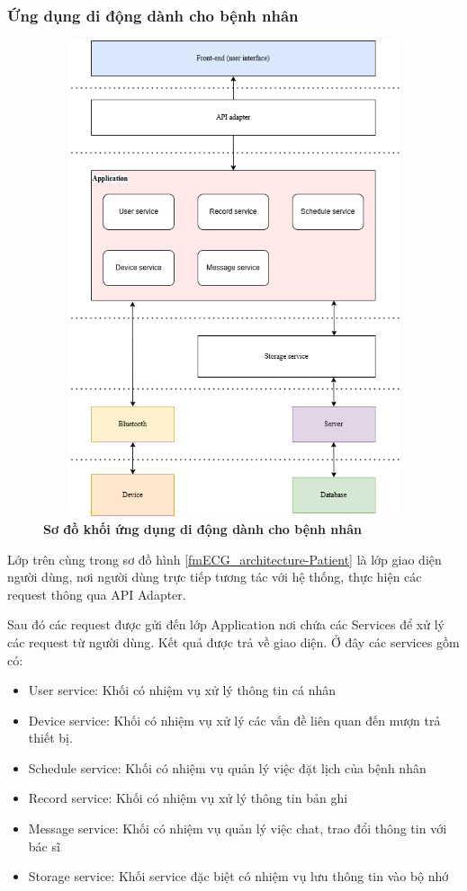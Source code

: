 \subsubsection{Ứng dụng di động dành cho bệnh nhân}
\begin{figure}[H]
  \centering
  \includegraphics[width=12cm,height=14cm]{Images/System/fmECG_architecture-Patient-App.drawio.png}
  \caption[Sơ đồ khối ứng dụng di động dành cho bệnh nhân]{\bfseries \fontsize{12pt}{0pt}\selectfont Sơ đồ khối ứng dụng di động dành cho bệnh nhân}
  \label{fmECG_architecture-Patient-App} %
\end{figure}
Lớp trên cùng trong sơ đồ hình \ref{fmECG_architecture-Patient} là lớp giao diện người dùng,
nơi người dùng trực tiếp tương tác với hệ thống, thực hiện các request thông qua API Adapter.

Sau đó các request được gửi đến lớp Application nơi chứa các Services để xử lý các request từ người dùng. 
Kết quả được trả về giao diện. Ở đây các services gồm có: 

\begin{adjustwidth}{1.5em}{}
  \begin{itemize}
    \item User service: Khối có nhiệm vụ xử lý thông tin cá nhân
    \item Device service: Khối có nhiệm vụ xử lý các vấn đề liên quan đến mượn trả thiết bị.
    \item Schedule service: Khối có nhiệm vụ quản lý việc đặt lịch của bệnh nhân
    \item Record service: Khối có nhiệm vụ xử lý thông tin bản ghi
    \item Message service: Khối có nhiệm vụ quản lý việc chat, trao đổi thông tin với bác sĩ
    \item Storage service: Khối service đặc biệt có nhiệm vụ lưu thông tin vào bộ nhớ
  \end{itemize}
\end{adjustwidth}

